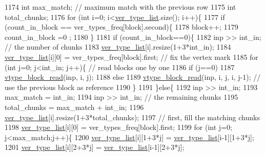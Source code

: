\begin{DoxyCode}
1174   \textcolor{keywordtype}{int} max\_match; \textcolor{comment}{// maximum match with the previous row}
1175   \textcolor{keywordtype}{int} total\_chunks; 
1176   \textcolor{keywordflow}{for} (\textcolor{keywordtype}{int} i=0; i<\hyperlink{classmarked__graph__compressed_af2e3e55223d436628a02758dfae88493}{ver\_type\_list}.size(); i++)\{
1177     \textcolor{keywordflow}{if} (count\_in\_block == ver\_types\_freq[block].second)\{
1178       block++;
1179       count\_in\_block =0 ;
1180     \}
1181     \textcolor{keywordflow}{if} (count\_in\_block==0)\{
1182       inp >> int\_in; \textcolor{comment}{// the number of chunks}
1183       \hyperlink{classmarked__graph__compressed_af2e3e55223d436628a02758dfae88493}{ver\_type\_list}[i].resize(1+3*int\_in);
1184       \hyperlink{classmarked__graph__compressed_af2e3e55223d436628a02758dfae88493}{ver\_type\_list}[i][0] = ver\_types\_freq[block].first; \textcolor{comment}{// fix the vertex mark}
1185       \textcolor{keywordflow}{for} (\textcolor{keywordtype}{int} j=0; j<int\_in; j++)\{ \textcolor{comment}{// read blocks one by one}
1186         \textcolor{keywordflow}{if} (j==0)
1187           \hyperlink{classmarked__graph__compressed_a4bf8563a2dfd3038dc5833c014320487}{vtype\_block\_read}(inp, i, j);
1188         \textcolor{keywordflow}{else}
1189           \hyperlink{classmarked__graph__compressed_a4bf8563a2dfd3038dc5833c014320487}{vtype\_block\_read}(inp, i, j, i, j-1); \textcolor{comment}{// use the previous block as reference}
1190       \}
1191     \}\textcolor{keywordflow}{else}\{
1192       inp >> int\_in;
1193       max\_match = int\_in;
1194       inp >> int\_in; \textcolor{comment}{// the remaining chunks}
1195       total\_chunks = max\_match + int\_in; 
1196       \hyperlink{classmarked__graph__compressed_af2e3e55223d436628a02758dfae88493}{ver\_type\_list}[i].resize(1+3*total\_chunks);
1197       \textcolor{comment}{// first, fill the matching chunks}
1198       \hyperlink{classmarked__graph__compressed_af2e3e55223d436628a02758dfae88493}{ver\_type\_list}[i][0] = ver\_types\_freq[block].first;
1199       \textcolor{keywordflow}{for} (\textcolor{keywordtype}{int} j=0; j<max\_match;j++)\{
1200         \hyperlink{classmarked__graph__compressed_af2e3e55223d436628a02758dfae88493}{ver\_type\_list}[i][1+3*j] = \hyperlink{classmarked__graph__compressed_af2e3e55223d436628a02758dfae88493}{ver\_type\_list}[i-1][1+3*j];
1201         \hyperlink{classmarked__graph__compressed_af2e3e55223d436628a02758dfae88493}{ver\_type\_list}[i][2+3*j] = \hyperlink{classmarked__graph__compressed_af2e3e55223d436628a02758dfae88493}{ver\_type\_list}[i-1][2+3*j];

\end{DoxyCode}
